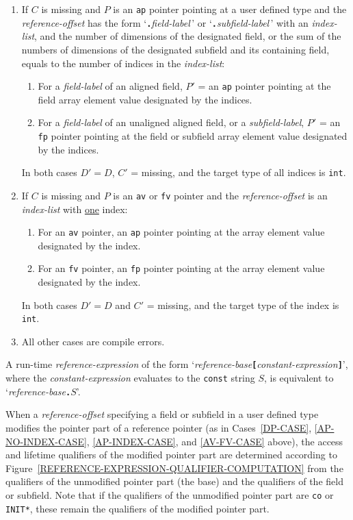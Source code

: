 \documentclass[12pt]{article}
\newcommand{\TT}[1]{{\tt \bfseries #1}}
\begin{document}
\begin{enumerate}
\item\label{AP-INDEX-CASE}
If $C$ is missing and
$P$ is an {\tt ap} pointer pointing at a user defined type and the
{\em reference-offset} has the form
`\TT{.}{\em field-label}\,' or `\TT{.}{\em subfield-label}\,' with
an {\em index-list}, and the number of dimensions of
the designated field, or the sum of the numbers of dimensions of the
designated subfield and its containing field,
equals to the number of indices in the {\em index-list}:
\begin{enumerate}
\item For a {\em field-label} of an aligned field,
$P'$ = an {\tt ap} pointer pointing at the field array element value
designated by the indices.
\item For a {\em field-label} of an unaligned aligned field,
or a {\em subfield-label}, $P'$ = an {\tt fp} pointer pointing at the
field or subfield array element value designated by the indices.
\end{enumerate}
In both cases $D'=D$, $C'$ = missing, and the target type of all indices
is {\tt int}.

\item\label{AV-FV-CASE}
If $C$ is missing and
$P$ is an {\tt av} or {\tt fv} pointer and the
{\em reference-offset} is an
{\em index-list} with \underline{one} index:
\begin{enumerate}
\item For an {\tt av} pointer,
an {\tt ap} pointer pointing at the array element value
designated by the index.
\item For an {\tt fv} pointer,
an {\tt fp} pointer pointing at the array element value
designated by the index.
\end{enumerate}
In both cases $D'=D$ and $C'$ = missing, and the target type of the index
is {\tt int}.

\item All other cases are compile errors.

\end{enumerate}

A run-time {\em reference-expression} of the form
`{\em reference-base}\TT{[}{\em constant-expression}\TT{]}',
where the {\em constant-expression} evaluates to the {\tt const}
string $S$, is equivalent to `{\em reference-base}\TT{.}$S$'.

When a {\em reference-offset} specifying a field or subfield
in a user defined type modifies the pointer part of
a reference pointer
(as in Cases~\ref{DP-CASE}, \ref{AP-NO-INDEX-CASE}, \ref{AP-INDEX-CASE},
and \ref{AV-FV-CASE} above),
the access and lifetime qualifiers of the modified
pointer part are determined according to
Figure~\ref{REFERENCE-EXPRESSION-QUALIFIER-COMPUTATION}%
\label{QUALIFIER-COMPUTATION}
from the qualifiers of the unmodified pointer part (the base)
and the qualifiers of the field or subfield.
Note that if the qualifiers of the unmodified pointer part
are {\tt co} or {\tt *INIT*}, these remain the qualifiers of the
modified pointer part.
\end{document}
